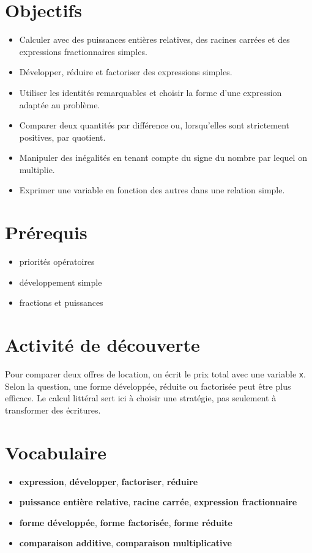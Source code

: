 \section{Objectifs}

\begin{itemize}
\item Calculer avec des puissances entières relatives, des racines carrées et des expressions fractionnaires simples.
\item Développer, réduire et factoriser des expressions simples.
\item Utiliser les identités remarquables et choisir la forme d'une expression adaptée au problème.
\item Comparer deux quantités par différence ou, lorsqu'elles sont strictement positives, par quotient.
\item Manipuler des inégalités en tenant compte du signe du nombre par lequel on multiplie.
\item Exprimer une variable en fonction des autres dans une relation simple.
\end{itemize}

\section{Prérequis}

\begin{itemize}
\item priorités opératoires
\item développement simple
\item fractions et puissances
\end{itemize}

\section{Activité de découverte}

Pour comparer deux offres de location, on écrit le prix total avec une variable \texttt{x}. Selon la question, une forme développée, réduite ou factorisée peut être plus efficace. Le calcul littéral sert ici à choisir une stratégie, pas seulement à transformer des écritures.

\section{Vocabulaire}

\begin{itemize}
\item \textbf{expression}, \textbf{développer}, \textbf{factoriser}, \textbf{réduire}
\item \textbf{puissance entière relative}, \textbf{racine carrée}, \textbf{expression fractionnaire}
\item \textbf{forme développée}, \textbf{forme factorisée}, \textbf{forme réduite}
\item \textbf{comparaison additive}, \textbf{comparaison multiplicative}
\end{itemize}

